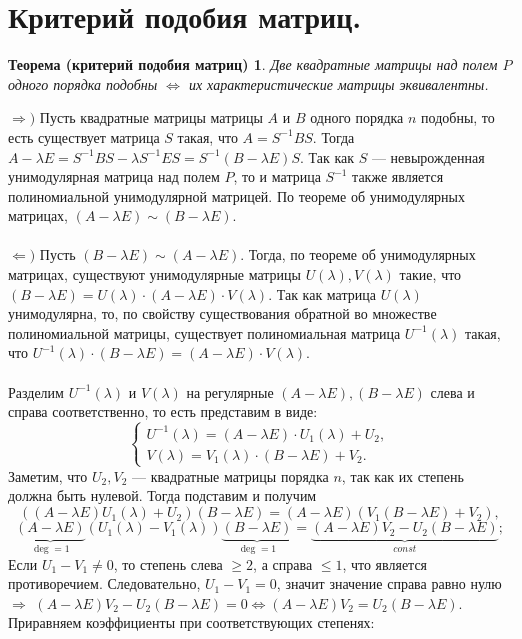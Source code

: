 \section{Критерий подобия матриц.}
\newtheorem*{th12_6}{Теорема (критерий подобия матриц)}\begin{th12_6}Две квадратные матрицы над полем $P$ одного порядка подобны
	$\Longleftrightarrow$ их характеристические матрицы эквивалентны.
\end{th12_6}\begin{Proof}
	$\Rightarrow)$ Пусть квадратные матрицы матрицы $A$ и $B$ одного порядка $n$ подобны, то есть существует матрица $S$ такая, что $A = S^{-1}BS$. Тогда $A-\lambda E = S^{-1} BS - \lambda S^{-1}ES = S^{-1}(B-\lambda E)S$. Так как $S$ --- невырожденная унимодулярная матрица над полем $P$, то и матрица $S^{-1}$ также является полиномиальной унимодулярной матрицей. По теореме об унимодулярных матрицах, $(A-\lambda E)\sim(B-\lambda E)$.\\\\
	$\Leftarrow)$ Пусть $(B-\lambda E)\sim(A-\lambda E)$. Тогда, по теореме об унимодулярных матрицах, существуют унимодулярные матрицы $U(\lambda), V(\lambda)$ такие, что $(B-\lambda E) = U(\lambda)\cdot (A-\lambda E)\cdot V(\lambda)$. Так как матрица $U(\lambda)$ унимодулярна, то, по свойству существования обратной во множестве полиномиальной матрицы, существует полиномиальная матрица $U^{-1}(\lambda)$ такая, что $U^{-1}(\lambda)\cdot(B-\lambda E) = (A-\lambda E)\cdot V(\lambda)$.\\\\
	Разделим $U^{-1}(\lambda)$ и $V(\lambda)$ на регулярные $(A-\lambda E), (B-\lambda E)$ слева и справа соответственно, то есть представим в виде:
	$$\begin{cases}
		U^{-1}(\lambda) = (A-\lambda E)\cdot U_1(\lambda) + U_2,\\
		V(\lambda) = V_1(\lambda)\cdot (B-\lambda E) +V_2.
	\end{cases}$$Заметим, что $U_2, V_2$ --- квадратные матрицы порядка $n$, так как их степень должна быть нулевой. Тогда подставим и получим
	$$((A-\lambda E)U_1(\lambda) + U_2)(B-\lambda E) = (A-\lambda E)(V_1(B-\lambda E) + V_2),$$
	$$\underbrace{(A-\lambda E)}_{\deg =1}(U_1(\lambda) - V_1(\lambda))\underbrace{(B-\lambda E)}_{\deg =1} = \underbrace{(A-\lambda E)V_2-U_2(B-\lambda E)}_{const};$$
	Если $U_1 - V_1 \ne 0$, то степень слева $\geqslant 2$, а справа $\leqslant 1$, что является противоречием. Следовательно, $U_1 - V_1 = 0$, значит значение справа равно нулю $\Rightarrow$ $(A-\lambda E)V_2 - U_2(B-\lambda E) = 0 \Leftrightarrow (A-\lambda E)V_2 = U_2(B-\lambda E)$. Приравняем коэффициенты при соответствующих степенях:\begin{center}

\end{center}
\end{Proof}
